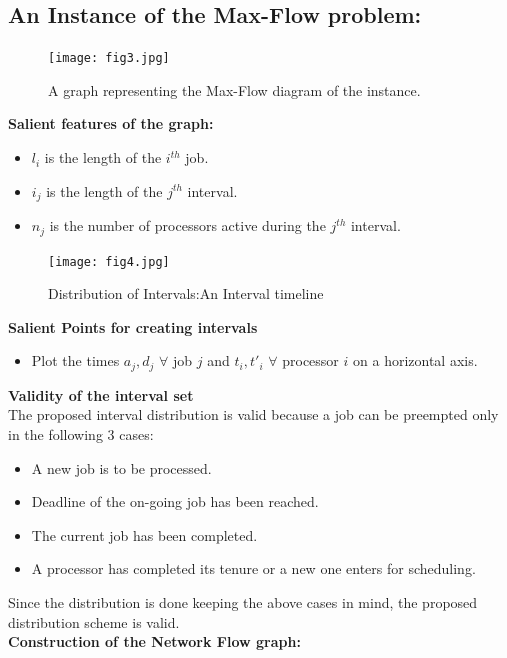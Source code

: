 \documentclass[pdftex,a4paper,12pt]{report}
\begin{document}
\subsection{An Instance of the Max-Flow problem:}
\begin{center}
\begin{figure}[ht!]
\centering
\texttt{[image: fig3.jpg]}
\caption{A graph representing the Max-Flow diagram of the instance.}
\label{fig:2.1}
\end{figure}
\end{center}
\textbf{Salient features of the graph:}
\begin{itemize}
\item $l_i$ is the length of the $i^{th}$ job.
\item $i_j$ is the length of the $j^{th}$ interval.
\item $n_j$ is the number of processors active during the $j^{th}$ interval.
\end{itemize}
\begin{center}
\begin{figure}[ht!]
\centering
\texttt{[image: fig4.jpg]}
\caption{Distribution of Intervals:An Interval timeline}
\label{fig:2.2}
\end{figure}
\end{center}
\textbf{Salient Points for creating intervals}
\begin{itemize}
\item Plot the times $a_j,d_j$ $\forall$ job $j$ and $t_i,t'_i$ $\forall$ processor $i$ on a horizontal axis.
\end{itemize}
\textbf{Validity of the interval set}\\
The proposed interval distribution is valid because a job can be preempted only in the following 3 cases:
\begin{itemize}
\item A new job is to be processed.
\item Deadline of the on-going job has been reached.
\item The current job has been completed.
\item A processor has completed its tenure or a new one enters for scheduling.
\end{itemize}
Since the distribution is done keeping the above cases in mind, the proposed distribution scheme is valid.\\
\textbf{Construction of the Network Flow graph:}\\
\end{document}
